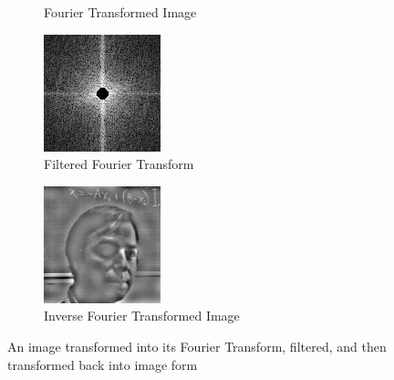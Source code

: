 \documentclass[12pt]{article}
\begin{document}
\begin{figure}[H]
\begin{subfigure}[t]{0.2\linewidth}
            \caption{Fourier Transformed Image}
        \end{subfigure}
        \begin{subfigure}[t]{0.2\linewidth}
            \centering
            \includegraphics[width=\linewidth]{filtered-transformed.png}
            \caption{Filtered Fourier Transform}
        \end{subfigure}
        \begin{subfigure}[t]{0.2\linewidth}
            \centering
            \includegraphics[width=\linewidth]{filtered-untransformed.png}
            \caption{Inverse Fourier Transformed Image}
        \end{subfigure}
        \caption{An image transformed into its Fourier Transform, filtered, and then transformed back into image form \cite{images}}
    \end{figure}
\end{document}
